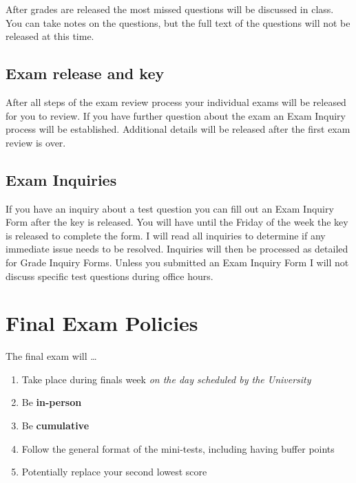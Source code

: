 \documentclass[
]{book}
\providecommand{\tightlist}{%
  \setlength{\itemsep}{0pt}\setlength{\parskip}{0pt}}
\begin{document}
After grades are released the most missed questions will be discussed in class. You can take notes on the questions, but the full text of the questions will not be released at this time.

\hypertarget{exam-release-and-key}{%
\section{Exam release and key}\label{exam-release-and-key}}

After all steps of the exam review process your individual exams will be released for you to review. If you have further question about the exam an Exam Inquiry process will be established. Additional details will be released after the first exam review is over.

\hypertarget{exam-inquiries}{%
\section{Exam Inquiries}\label{exam-inquiries}}

If you have an inquiry about a test question you can fill out an Exam Inquiry Form after the key is released.
You will have until the Friday of the week the key is released to complete the form.
I will read all inquiries to determine if any immediate issue needs to be resolved. Inquiries will then be processed as detailed for Grade Inquiry Forms.
Unless you submitted an Exam Inquiry Form I will not discuss specific test questions during office hours.

\hypertarget{final-exam-policies}{%
\chapter{Final Exam Policies}\label{final-exam-policies}}

The final exam will \ldots{}

\begin{enumerate}
\def\labelenumi{\arabic{enumi}.}
\tightlist
\item
  Take place during finals week \emph{on the day scheduled by the University}
\item
  Be \textbf{in-person}
\item
  Be \textbf{cumulative}
\item
  Follow the general format of the mini-tests, including having buffer points
\item
  Potentially replace your second lowest score
\end{enumerate}
\end{document}
